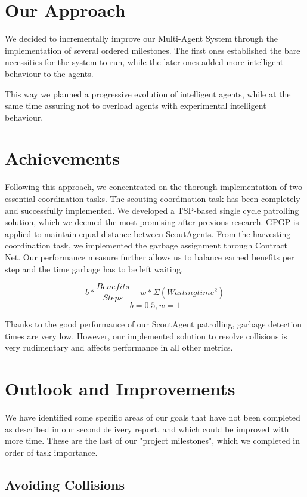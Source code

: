 \section{Our Approach}

We decided to incrementally improve our Multi-Agent System through the implementation of several ordered milestones. The first ones established the bare necessities for the system to run, while the later ones added more intelligent behaviour to the agents.

This way we planned a progressive evolution of intelligent agents, while at the same time assuring not to overload agents with experimental intelligent behaviour.


\section{Achievements}

Following this approach, we concentrated on the thorough implementation of two essential coordination tasks. The scouting coordination task has been completely and successfully implemented. We developed a TSP-based single cycle patrolling solution, which we deemed the most promising after previous research. GPGP is applied to maintain equal distance between ScoutAgents. From the harvesting coordination task, we implemented the garbage assignment through Contract Net. Our performance measure further allows us to balance earned benefits per step and the time garbage has to be left waiting.

\[ b * \frac{Benefits}{Steps} - w * \Sigma(Waitingtime^2) \]
\[ b = 0.5, w = 1 \]

Thanks to the good performance of our ScoutAgent patrolling, garbage detection times are very low. However, our implemented solution to resolve collisions is very rudimentary and affects performance in all other metrics.


\section{Outlook and Improvements}

We have identified some specific areas of our goals that have not been completed as described in our second delivery report, and which could be improved with more time. These are the last of our "project milestones", which we completed in order of task importance.


\subsection{Avoiding Collisions}

